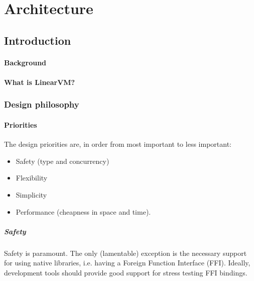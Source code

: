 \documentclass[a4paper]{book}
\begin{document}
\tableofcontents
\part{Architecture}

\chapter{Introduction}

\subsection{Background}


\subsection{What is LinearVM?}

\section{Design philosophy}

\subsection{Priorities}

The design priorities are, in order from most important to less important:

\begin{itemize}
\item Safety (type and concurrency)
\item Flexibility
\item Simplicity
\item Performance (cheapness in space and time).
\end{itemize}

\subsubsection*{Safety}
Safety is paramount. The only (lamentable) exception is the
necessary support for using native libraries, i.e. having a Foreign
Function Interface (FFI). Ideally, development tools should provide
good support for stress testing FFI bindings.
\end{document}
